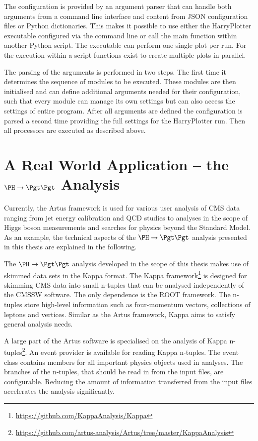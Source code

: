 \documentclass[3p]{elsarticle}
\begin{document}
The configuration is provided by an argument parser that can handle both arguments from a command line interface and content from JSON configuration files or Python dictionaries. This makes it possible to use either the HarryPlotter executable configured via the command line or call the main function within another Python script. The executable can perform one single plot per run. For the execution within a script functions exist to create multiple plots in parallel.

The parsing of the arguments is performed in two steps. The first time it determines the sequence of modules to be executed. These modules are then initialised and can define additional arguments needed for their configuration, such that every module can manage its own settings but can also access the settings of entire program. After all arguments are defined the configuration is parsed a second time providing the full settings for the HarryPlotter run. Then all processors are executed as described above.


\section{A Real World Application -- the $\PH\to\Pgt\Pgt$ Analysis \label{section_artus_example_htt}}

Currently, the Artus framework is used for various user analysis of CMS data ranging from jet energy calibration and QCD studies to analyses in the scope of Higgs boson measurements and searches for physics beyond the Standard Model. As an example, the technical aspects of the $\PH\to\Pgt\Pgt$ analysis presented in this thesis are explained in the following.

The $\PH\to\Pgt\Pgt$ analysis developed in the scope of this thesis makes use of skimmed data sets in the Kappa format. The Kappa framework\footnote{\url{https://github.com/KappaAnalysis/Kappa}} is designed for skimming CMS data into small n-tuples that can be analysed independently of the CMSSW software. The only dependence is the ROOT framework. The n-tuples store high-level information such as four-momentum vectors, collections of leptons and vertices. Similar as the Artus framework, Kappa aims to satisfy general analysis needs.

A large part of the Artus software is specialised on the analysis of Kappa n-tuples\footnote{\url{https://github.com/artus-analysis/Artus/tree/master/KappaAnalysis}}. An event provider is available for reading Kappa n-tuples. The event class contains members for all important physics objects used in analyses. The branches of the n-tuples, that should be read in from the input files, are configurable. Reducing the amount of information transferred from the input files accelerates the analysis significantly.
\end{document}

